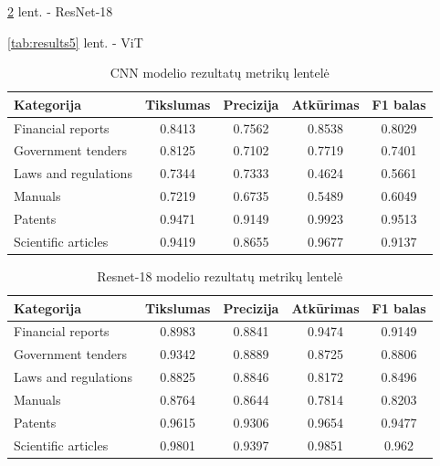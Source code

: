 \documentclass[conference]{IEEEtran}
\begin{document}
\ref{tab:results3} lent. - ResNet-18 

\ref{tab:results5} lent. - ViT 

\begin{table}[p]
    \centering
    \caption{CNN modelio rezultatų metrikų lentelė}
    \label{tab:results2}
    \begin{tabular}{lcccc}
    \hline
    Kategorija & Tikslumas & Precizija & Atkūrimas & F1 balas \\
    \hline
    Financial reports & 0.8413 & 0.7562 & 0.8538 & 0.8029 \\
    Government tenders & 0.8125 & 0.7102 & 0.7719 & 0.7401 \\
    Laws and regulations & 0.7344 & 0.7333 & 0.4624 & 0.5661 \\
    Manuals & 0.7219 & 0.6735 & 0.5489 & 0.6049 \\
    Patents & 0.9471 & 0.9149 & 0.9923 & 0.9513 \\
    Scientific articles & 0.9419 & 0.8655 & 0.9677 & 0.9137 \\
    \hline
    \end{tabular}
\end{table}

\begin{table}[p]
    \vfill
    \centering
    \caption{Resnet-18 modelio rezultatų metrikų lentelė}
    \label{tab:results3}
    \begin{tabular}{lcccc}
    \hline
    Kategorija & Tikslumas & Precizija & Atkūrimas & F1 balas \\
    \hline
    Financial reports & 0.8983 & 0.8841 & 0.9474 & 0.9149 \\
    Government tenders & 0.9342 & 0.8889 & 0.8725 & 0.8806 \\
    Laws and regulations & 0.8825 & 0.8846 & 0.8172 & 0.8496 \\
    Manuals & 0.8764 & 0.8644 & 0.7814 & 0.8203 \\
    Patents & 0.9615 & 0.9306 & 0.9654 & 0.9477 \\
    Scientific articles & 0.9801 & 0.9397 & 0.9851 & 0.962 \\
    \hline
    \end{tabular}
\end{table}
\end{document}
